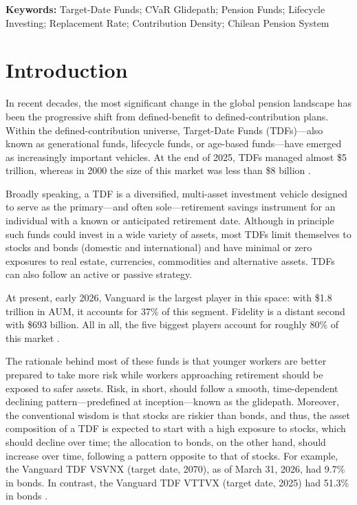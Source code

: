 \documentclass[11pt]{article}
\begin{document}
\noindent\textbf{Keywords:} Target-Date Funds; CVaR Glidepath;  Pension Funds; Lifecycle Investing; Replacement Rate; Contribution Density; Chilean Pension System


\section{Introduction}

In recent decades, the most significant change in the global pension landscape has been the progressive shift from defined-benefit to defined-contribution plans. Within the defined-contribution universe, Target-Date Funds (TDFs)—also known as generational funds, lifecycle funds, or age-based funds—have emerged as increasingly important vehicles. At the end of 2025, TDFs managed almost \$5 trillion, whereas in 2000 the size of this market was less than  \$8 billion \cite{roy2026,parker2023}.

Broadly speaking, a TDF is a diversified, multi-asset investment vehicle designed to serve as the primary---and often sole---retirement savings instrument for an individual with a known or anticipated retirement date. Although in principle such funds could invest in a wide variety of assets, most TDFs limit themselves to stocks and bonds (domestic and international) and have minimal or zero exposures to real estate, currencies, commodities and alternative assets. TDFs can also follow an active or passive strategy.

At present, early 2026, Vanguard is the largest  player in this space: with \$1.8 trillion in AUM, it accounts for 37\% of this segment. Fidelity is a distant second with \$693 billion. All in all, the five biggest players account for roughly 80\% of this market \cite{roy2026}.

The rationale behind most of these funds is that younger workers are better prepared to take more risk while workers approaching retirement should be exposed to safer assets. Risk, in short, should follow a smooth, time-dependent declining pattern---predefined at inception---known as the glidepath. Moreover, the conventional wisdom is that stocks are riskier than bonds, and thus, the asset composition of a TDF is expected to start with a high exposure to stocks, which should decline over time; the allocation to bonds, on the other hand, should increase over time, following a pattern opposite to that of stocks. For example, the Vanguard TDF VSVNX (target date, 2070), as of March 31, 2026, had 9.7\% in bonds. In contrast, the Vanguard TDF VTTVX (target date, 2025) had 51.3\% in bonds \cite{vanguard2070,vanguard2025}.
\end{document}
